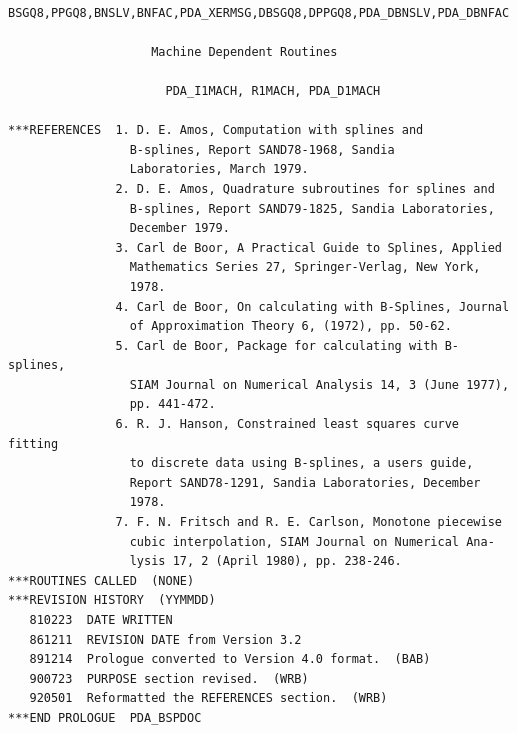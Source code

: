 \documentclass[11pt,twoside]{article}
\begin{document}
\begin{verbatim}
       BSGQ8,PPGQ8,BNSLV,BNFAC,PDA_XERMSG,DBSGQ8,DPPGQ8,PDA_DBNSLV,PDA_DBNFAC

                    Machine Dependent Routines

                      PDA_I1MACH, R1MACH, PDA_D1MACH

***REFERENCES  1. D. E. Amos, Computation with splines and
                 B-splines, Report SAND78-1968, Sandia
                 Laboratories, March 1979.
               2. D. E. Amos, Quadrature subroutines for splines and
                 B-splines, Report SAND79-1825, Sandia Laboratories,
                 December 1979.
               3. Carl de Boor, A Practical Guide to Splines, Applied
                 Mathematics Series 27, Springer-Verlag, New York,
                 1978.
               4. Carl de Boor, On calculating with B-Splines, Journal
                 of Approximation Theory 6, (1972), pp. 50-62.
               5. Carl de Boor, Package for calculating with B-splines,
                 SIAM Journal on Numerical Analysis 14, 3 (June 1977),
                 pp. 441-472.
               6. R. J. Hanson, Constrained least squares curve fitting
                 to discrete data using B-splines, a users guide,
                 Report SAND78-1291, Sandia Laboratories, December
                 1978.
               7. F. N. Fritsch and R. E. Carlson, Monotone piecewise
                 cubic interpolation, SIAM Journal on Numerical Ana-
                 lysis 17, 2 (April 1980), pp. 238-246.
***ROUTINES CALLED  (NONE)
***REVISION HISTORY  (YYMMDD)
   810223  DATE WRITTEN
   861211  REVISION DATE from Version 3.2
   891214  Prologue converted to Version 4.0 format.  (BAB)
   900723  PURPOSE section revised.  (WRB)
   920501  Reformatted the REFERENCES section.  (WRB)
***END PROLOGUE  PDA_BSPDOC
\end{verbatim}

\end{document}
